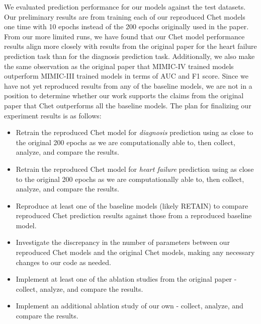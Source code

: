 \documentclass[11pt,a4paper,fleqn]{article}
\begin{document}
We evaluated prediction performance for our models against the test datasets.
Our preliminary results are from training each of our reproduced Chet models one
time with 10 epochs instead of the 200 epochs originally used in the paper. From
our more limited runs, we have found that our Chet model performance results
align more closely with results from the original paper for the heart failure
prediction task than for the diagnosis prediction task. Additionally, we also
make the same observation as the original paper that MIMIC-IV trained models
outperform MIMIC-III trained models in terms of AUC and F1 score. Since we have not yet reproduced results from any of the baseline models, we are not
in a position to determine whether our work supports the claims from the original
paper that Chet outperforms all the baseline models.
The plan for finalizing our experiment results is as follows: 
\begin{itemize}
    \item Retrain the reproduced Chet model for \emph{diagnosis} prediction using as
    close to the original 200 epochs as we are computationally able to, then
    collect, analyze, and compare the results.
    \item Retrain the reproduced Chet model for \emph{heart failure} prediction using
    as close to the original 200 epochs as we are computationally able to, then
    collect, analyze, and compare the results.
    \item Reproduce at least one of the baseline models (likely RETAIN) to
    compare reproduced Chet prediction results against those from a reproduced
    baseline model.
    \item Investigate the discrepancy in the number of parameters between our
    reproduced Chet models and the original Chet models, making any necessary 
    changes to our code as needed.
    \item Implement at least one of the ablation studies from the original
    paper - collect, analyze, and compare the results.
    \item Implement an additional ablation study of our own - collect, analyze,
    and compare the results.
\end{itemize}
\end{document}

